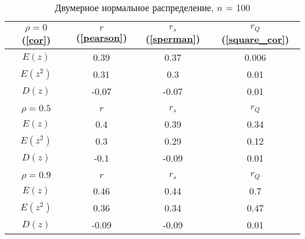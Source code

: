 \documentclass[a4paper]{article}
\begin{document}
        \begin{table}[H]
            \centering
            \begin{tabular}{|c|c|c|c|}
                \hline
                 $\rho = 0$ (\ref{cor}) & $r$ (\ref{pearson}) & $r_s$ (\ref{sperman}) & $r_Q$ (\ref{square_cor})  \\ \hline
                 $E(z)$ & 0.39 & 0.37 & 0.006  \\ \hline
                 $E(z^2)$ & 0.31 & 0.3 & 0.01  \\ \hline
                 $D(z)$ & -0.07 & -0.07 & 0.01  \\ \hline
                 & & & \\ \hline
                 $\rho = 0.5$ & $r$ & $r_s$ & $r_Q$  \\ \hline
                 $E(z)$ & 0.4 & 0.39 & 0.34 \\ \hline
                 $E(z^2)$ & 0.3 & 0.29 & 0.12  \\ \hline
                 $D(z)$ & -0.1 & -0.09 & 0.01  \\ \hline
                 & & & \\ \hline
                 $\rho = 0.9$ & $r$ & $r_s$ & $r_Q$  \\ \hline
                 $E(z)$ & 0.46 & 0.44 & 0.7  \\ \hline
                 $E(z^2)$ & 0.36 & 0.34 & 0.47  \\ \hline
                 $D(z)$ & -0.09 & -0.09 & 0.01  \\ \hline
                 
            \end{tabular}
            \caption{Двумерное нормальное распределение, $n$ = 100}
            \label{tab:normal_100}
        \end{table}
        
\end{document}
